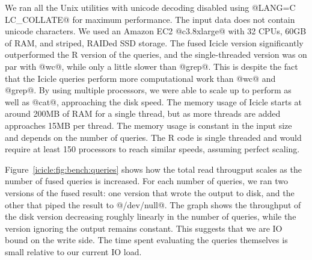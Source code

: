 We ran all the Unix utilities with unicode decoding disabled using @LANG=C LC_COLLATE@ for maximum performance. The input data does not contain unicode characters. 
We used an Amazon EC2 @c3.8xlarge@ with 32 CPUs, 60GB of RAM, and striped, RAIDed SSD storage. The fused Icicle version significantly outperformed the R version of the queries, and the single-threaded version was on par with @wc@, while only a little slower than @grep@. This is despite the fact that the Icicle queries perform more computational work than @wc@ and @grep@. By using multiple processors, we were able to scale up to perform as well as @cat@, approaching the disk speed.
The memory usage of Icicle starts at around 200MB of RAM for a single thread, but as more threads are added approaches 15MB per thread.
The memory usage is constant in the input size and depends on the number of queries.
The R code is single threaded and would require at least 150 processors to reach similar speeds, assuming perfect scaling.









Figure~\ref{icicle:fig:bench:queries} shows how the total read througput scales as the number of fused queries is increased.
For each number of queries, we ran two versions of the fused result: one version that wrote the output to disk, and the other that piped the result to @/dev/null@.
The graph shows the throughput of the disk version decreasing roughly linearly in the number of queries, while the version ignoring the output remains constant.
This suggests that we are IO bound on the write side.
The time spent evaluating the queries themselves is small relative to our current IO load.

